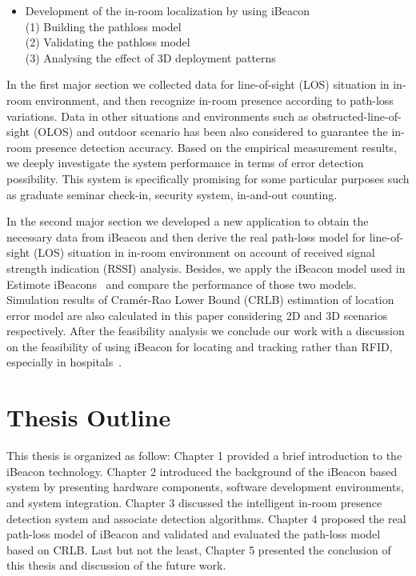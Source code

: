 \documentclass[12pt]{report}
\begin{document}
\begin{itemize}
\item Development of the in-room localization by using iBeacon \\
\hspace{10mm} (1) Building the pathloss model \\
\hspace{10mm} (2) Validating the pathloss model \\
\hspace{10mm} (3) Analysing the effect of 3D deployment patterns 
\end{itemize}

In the first major section we collected data for line-of-sight (LOS) situation in in-room environment, and then recognize in-room presence according to path-loss variations. Data in other situations and environments such as obstructed-line-of-sight (OLOS) and outdoor scenario has been also considered to guarantee the in-room presence detection accuracy. Based on the empirical measurement results, we deeply investigate the system performance in terms of error detection possibility. This system is specifically promising for some particular purposes such as graduate seminar check-in, security system, in-and-out counting.

In the second major section we developed a new application to obtain the necessary data from iBeacon and then derive the real path-loss model for line-of-sight (LOS) situation in in-room environment on account of received signal strength indication (RSSI) analysis. Besides, we apply the iBeacon model used in Estimote iBeacons~\cite{estlink} and compare the performance of those two models. Simulation results of Cramér-Rao Lower Bound (CRLB) estimation of location error model are also calculated in this paper considering 2D and 3D scenarios respectively. After the feasibility analysis we conclude our work with a discussion on the feasibility of using iBeacon for locating and tracking rather than RFID, especially in hospitals~\cite{che}.

\section{Thesis Outline}
This thesis is organized as follow: Chapter 1 provided a brief introduction to the iBeacon technology. Chapter 2 introduced the background of the iBeacon based system by presenting hardware components, software development environments, and system integration. Chapter 3 discussed the intelligent in-room presence detection system and associate detection algorithms. Chapter 4 proposed the real path-loss model of iBeacon and validated and evaluated the path-loss model based on CRLB. Last but not the least, Chapter 5 presented the conclusion of this thesis and discussion of the future work. 
\end{document}
